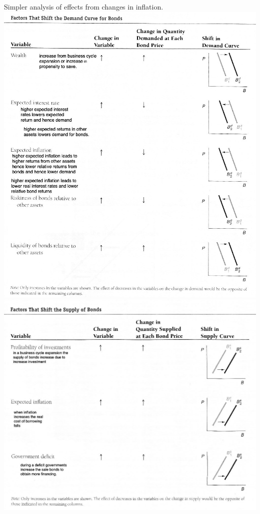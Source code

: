 \documentclass[12pt]{examnotes}
\begin{document}
\ra Simpler analysis of effects from changes in inflation.
\includegraphics[scale=0.5]{./imgs/52.jpg}
\includegraphics[scale=0.45]{./imgs/53.jpg}
\end{document}
